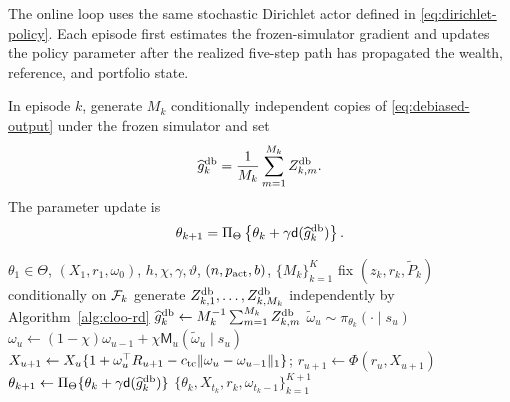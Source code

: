 The online loop uses the same stochastic Dirichlet actor defined in \eqref{eq:dirichlet-policy}.  Each episode first estimates the frozen-simulator gradient and updates the policy parameter after the realized five-step path has propagated the wealth, reference, and portfolio state.

In episode $k$, generate $M_k$ conditionally independent copies of \eqref{eq:debiased-output} under the frozen simulator and set
\begin{equation}\label{eq:gradient-average}
 \widehat g_k^{\mathrm{db}}
 =\frac1{M_k}\sum_{m=1}^{M_k}Z_{k,m}^{\mathrm{db}}.
\end{equation}
The parameter update is
\begin{equation}\label{eq:parameter-update}
 \theta_{k+1}
 =\Pi_\Theta\left\{\theta_k+\gamma\mathsf d(\widehat g_k^{\mathrm{db}})\right\}.
\end{equation}

\begin{algorithm}[H]
\caption{Dynamic-reference CPT policy gradient (\DRCPTPG)}\label{alg:drcptpg}
\begin{algorithmic}[1]
\Require $\theta_1\in\Theta$, $(X_1,r_1,\omega_0)$, $h,\chi,\gamma,\vartheta$, $(n,p_{\rm act},b)$, $\{M_k\}_{k=1}^{K}$
    \State fix $(z_k,r_k,\widetilde P_k)$ conditionally on $\mathcal F_k$
    \State generate $Z_{k,1}^{\mathrm{db}},\ldots,Z_{k,M_k}^{\mathrm{db}}$ independently by Algorithm~\ref{alg:cloo-rd}
    \State $\widehat g_k^{\mathrm{db}}\gets M_k^{-1}\sum_{m=1}^{M_k}Z_{k,m}^{\mathrm{db}}$
        \State $\widetilde\omega_u\sim\pi_{\theta_k}(\cdot\mid s_u)$
        \State $\omega_u\gets(1-\chi)\omega_{u-1}+\chi\mathsf M_u(\widetilde\omega_u\mid s_u)$
        \State $X_{u+1}\gets X_u\{1+\omega_u^\top R_{u+1}-c_{\rm tc}\lVert\omega_u-\omega_{u-1}\rVert_1\}$; \quad $r_{u+1}\gets\Phi(r_u,X_{u+1})$
    \EndFor
    \State $\theta_{k+1}\gets\Pi_\Theta\{\theta_k+\gamma\mathsf d(\widehat g_k^{\mathrm{db}})\}$
\EndFor
\State \Return $\{\theta_k,X_{t_k},r_k,\omega_{t_k-1}\}_{k=1}^{K+1}$
\end{algorithmic}
\end{algorithm}
\FloatBarrier
